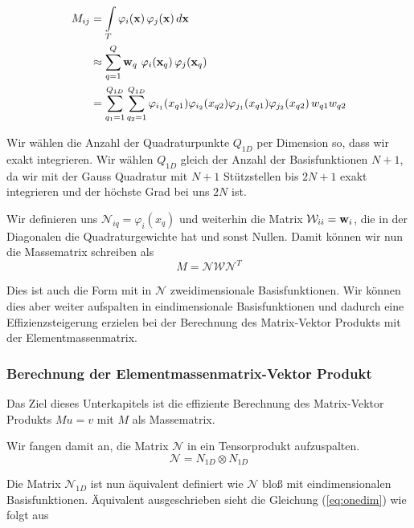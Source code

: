 \begin{equation} \label{eq:massapprox}
\begin{aligned}
M_{ij} &= \int\limits_{T} \varphi_i (\bold{x}) \, \varphi_j (\bold{x}) \, d\bold{x} \\
&\approx  \sum\limits_{q=1}^Q \bold{w}_q \, \, \varphi_i (\bold{x}_q) \, \varphi_j (\bold{x}_q) \\
&= \sum\limits_{q_1=1}^{Q_{1D}} \sum\limits_{q_2=1}^{Q_{1D}} \varphi_{i_1}(x_{q1}) \varphi_{i_2}(x_{q2}) \varphi_{j_1}(x_{q1}) \varphi_{j_2}(x_{q2}) \, w_{q1} w_{q2}
\end{aligned}
\end{equation}

Wir wählen die Anzahl der Quadraturpunkte $Q_{1D}$ per Dimension so, dass wir exakt integrieren. Wir wählen $Q_{1D}$ gleich der Anzahl der Basisfunktionen $N+1$, da wir mit der Gauss Quadratur mit $N+1$ Stützstellen bis $2N+1$ exakt integrieren und der höchste Grad bei uns $2N$ ist.

Wir definieren uns $\mathcal{N}_{iq}=\varphi_i(x_q)$ und weiterhin die Matrix $\mathcal{W}_{ii}=\bold{w}_i$, die in der Diagonalen die Quadraturgewichte hat und sonst Nullen. Damit können wir nun die Massematrix schreiben als
\begin{equation}
M = \mathcal{N} \mathcal{W} \mathcal{N}^T
\end{equation}

Dies ist auch die Form mit in $\mathcal{N}$ zweidimensionale Basisfunktionen. Wir können dies aber weiter aufspalten in eindimensionale Basisfunktionen und dadurch eine Effizienzsteigerung erzielen bei der Berechnung des Matrix-Vektor Produkts mit der Elementmassenmatrix.
\subsubsection{Berechnung der Elementmassenmatrix-Vektor Produkt}

Das Ziel dieses Unterkapitels ist die effiziente Berechnung des Matrix-Vektor Produkts $Mu=v$ mit $M$ als Massematrix.

Wir fangen damit an, die Matrix $\mathcal{N}$ in ein Tensorprodukt aufzuspalten. 
\begin{equation} \label{eq:onedim}
\mathcal{N} = N_{1D} \otimes N_{1D}
\end{equation}

Die Matrix $\mathcal{N}_{1D}$ ist nun äquivalent definiert wie $\mathcal{N}$ bloß mit eindimensionalen Basisfunktionen. Äquivalent ausgeschrieben sieht die Gleichung (\ref{eq:onedim}) wie folgt aus

